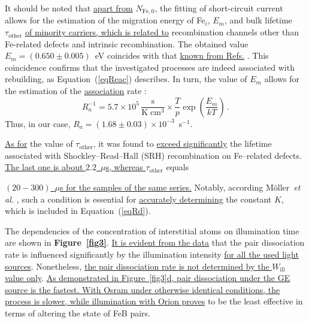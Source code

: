 \documentclass{WileyMSP-template}
\begin{document}
It should be noted that \textcolor[rgb]{0.00,0.07,1.00}{\uline{apart from}} $N_\mathrm{Fe,0}$,
the fitting of short-circuit current \cite{Olikh2022:JMatSci,Olikh2021JAP} allows for the estimation of the migration energy of Fe$_i$, $E_m$,
and bulk lifetime $\tau_\mathrm{other}$ \textcolor[rgb]{0.00,0.07,1.00}{\uline{of minority carriers, which is related to}} recombination channels other than Fe-related defects and intrinsic recombination.
The obtained value $E_m=(0.650\pm0.005)$~eV coincides with that \textcolor[rgb]{0.00,0.07,1.00}{\uline{known from Refs.}} \cite{FeBKin2019,FeBAssSST2011,FeBkinAPL2008}.
This coincidence confirms that the investigated processes are indeed associated with rebuilding,
as Equation~(\ref{eqReac}) describes.
In turn, the value of $E_m$ allows for the estimation of the \textcolor[rgb]{0.00,0.07,1.00}{\uline{association}} rate \cite{FeBAssJAP2014,FeBKin2019,FeBAssSST2011}:
\begin{equation}
\label{eqTass}
R_a^{-1}=5.7\times10^5\,\frac{\mathrm{s}}{\mathrm{K}\;\mathrm{cm}^3}\times\frac{T}{p}\exp\left(\frac{E_m}{kT}\right)\,.
\end{equation}
Thus, in our case, $R_a=(1.68\pm0.03)\times10^{-3}$~s$^{-1}$.

\textcolor[rgb]{0.00,0.07,1.00}{\uline{As for}} the value of $\tau_\mathrm{other}$, it was found to \textcolor[rgb]{0.00,0.07,1.00}{\uline{exceed significantly}} the
lifetime associated with Shockley--Read--Hall (SRH) recombination on Fe--related defects.
\textcolor[rgb]{0.00,0.07,1.00}{\uline{The last one is about $2.2$~$\mu$s, whereas $\tau_\mathrm{other}$} equals}

\textcolor[rgb]{0.00,0.07,1.00}{\uline{  $(20-300)$~$\mu$s for the samples of the same series.}}
Notably, according M\"{o}ller~\emph{et al.} \cite{FeBAssJAP2014},
such a condition is essential for \textcolor[rgb]{0.00,0.07,1.00}{\uline{accurately determining}} the constant $K$, which is included in Equation~(\ref{eqRd}).

The dependencies of the concentration of interstitial atoms on illumination time are shown in \textbf{Figure~\ref{fig3}}.
\textcolor[rgb]{0.00,0.07,1.00}{\uline{It is evident from the data}} that the pair dissociation rate is influenced significantly by the illumination intensity
\textcolor[rgb]{0.00,0.07,1.00}{\uline{for all the used light sources}}.
Nonetheless, \textcolor[rgb]{0.00,0.07,1.00}{\uline{the pair dissociation rate is not determined by the $W_\mathrm{ill}$ value only}}.
\textcolor[rgb]{0.00,0.07,1.00}{\uline{As demonstrated in Figure~\ref{fig3}d, pair dissociation under the GE source is the fastest.
With Osram under otherwise identical conditions, the process is slower,
while illumination with Orion proves}} to be the least effective in terms of altering the state of FeB pairs.
\end{document}
